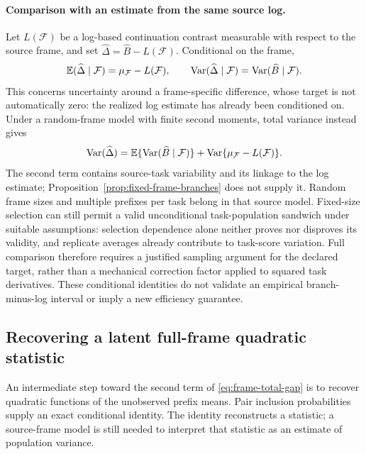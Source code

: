 \paragraph{Comparison with an estimate from the same source log.}
Let $L(\mathcal F)$ be a log-based continuation contrast measurable with respect to the source frame, and set $\widehat\Delta=\widehat B-L(\mathcal F)$. Conditional on the frame,
\begin{equation}
 \mathbb{E}(\widehat\Delta\mid\mathcal F)=\mu_{\mathcal F}-L(\mathcal F),\qquad
 \operatorname{Var}(\widehat\Delta\mid\mathcal F)=\operatorname{Var}(\widehat B\mid\mathcal F).
 \label{eq:frame-conditional-gap}
\end{equation}
This concerns uncertainty around a frame-specific difference, whose target is not automatically zero: the realized log estimate has already been conditioned on. Under a random-frame model with finite second moments, total variance instead gives
\begin{equation}
 \operatorname{Var}(\widehat\Delta)
 =\mathbb{E}\{\operatorname{Var}(\widehat B\mid\mathcal F)\}
 +\operatorname{Var}\{\mu_{\mathcal F}-L(\mathcal F)\}.
 \label{eq:frame-total-gap}
\end{equation}
The second term contains source-task variability and its linkage to the log estimate; Proposition~\ref{prop:fixed-frame-branches} does not supply it. Random frame sizes and multiple prefixes per task belong in that source model. Fixed-size selection can still permit a valid unconditional task-population sandwich under suitable assumptions: selection dependence alone neither proves nor disproves its validity, and replicate averages already contribute to task-score variation. Full comparison therefore requires a justified sampling argument for the declared target, rather than a mechanical correction factor applied to squared task derivatives. These conditional identities do not validate an empirical branch-minus-log interval or imply a new efficiency guarantee.

\subsection{Recovering a latent full-frame quadratic statistic}
\label{sec:frame-quadratic}

An intermediate step toward the second term of \eqref{eq:frame-total-gap} is to recover quadratic functions of the unobserved prefix means. Pair inclusion probabilities supply an exact conditional identity. The identity reconstructs a statistic; a source-frame model is still needed to interpret that statistic as an estimate of population variance.

